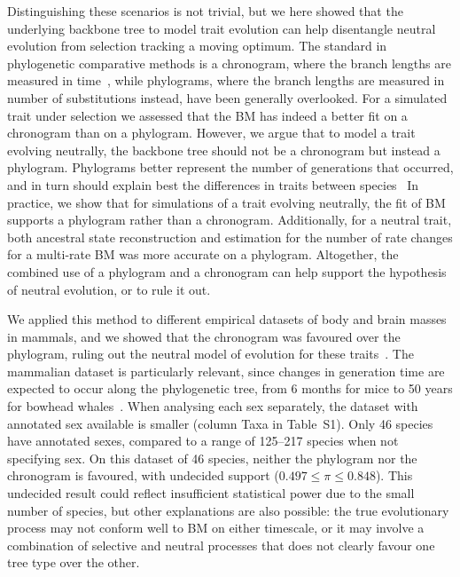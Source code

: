 \documentclass{article}
\newcommand{\PhyloSupport}{\pi}
\begin{document}
Distinguishing these scenarios is not trivial, but we here showed that the underlying backbone tree to model trait evolution can help disentangle neutral evolution from selection tracking a moving optimum.
The standard in phylogenetic comparative methods is a chronogram, where the branch lengths are measured in time~\citep{felsenstein_phylogenies_1985, harmon_phylogenetic_2018}, while phylograms, where the branch lengths are measured in number of substitutions instead, have been generally overlooked.
For a simulated trait under selection we assessed that the BM has indeed a better fit on a chronogram than on a phylogram.
However, we argue that to model a trait evolving neutrally, the backbone tree should not be a chronogram but instead a phylogram.
Phylograms better represent the number of generations that occurred, and in turn should explain best the differences in traits between species~\citep{latrille_detecting_2024}
In practice, we show that for simulations of a trait evolving neutrally, the fit of BM supports a phylogram rather than a chronogram.
Additionally, for a neutral trait, both ancestral state reconstruction and estimation for the number of rate changes for a multi-rate BM was more accurate on a phylogram.
Altogether, the combined use of a phylogram and a chronogram can help support the hypothesis of neutral evolution, or to rule it out.

We applied this method to different empirical datasets of body and brain masses in mammals, and we showed that the chronogram was favoured over the phylogram, ruling out the neutral model of evolution for these traits~\citep{latrille_detecting_2024}.
The mammalian dataset is particularly relevant, since changes in generation time are expected to occur along the phylogenetic tree, from 6 months for mice to 50 years for bowhead whales~\citep{demagalhaes_database_2009, nielsen_eye_2016}.
When analysing each sex separately, the dataset with annotated sex available is smaller (column Taxa in Table~S1).
Only 46 species have annotated sexes, compared to a range of 125--217 species when not specifying sex.
On this dataset of 46 species, neither the phylogram nor the chronogram is favoured, with undecided support ($0.497 \leq \PhyloSupport \leq 0.848$).
This undecided result could reflect insufficient statistical power due to the small number of species, but other explanations are also possible: the true evolutionary process may not conform well to BM on either timescale, or it may involve a combination of selective and neutral processes that does not clearly favour one tree type over the other.
\end{document}
